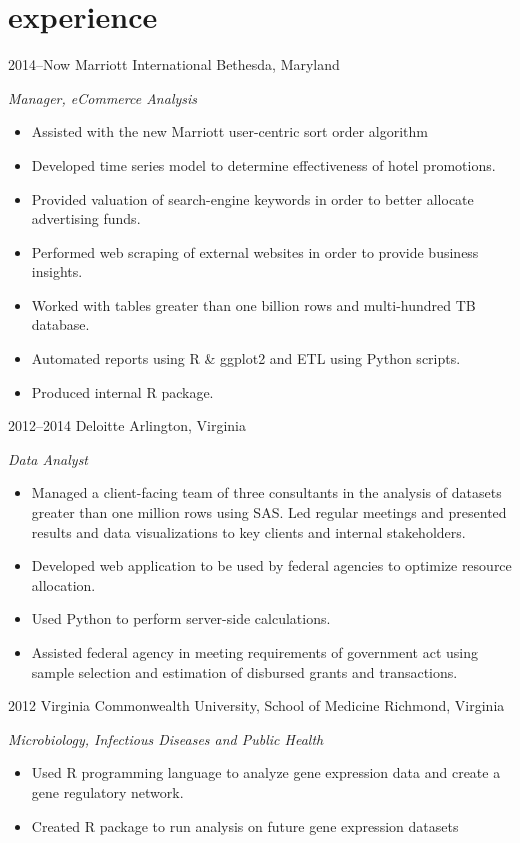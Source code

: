 \documentclass[]{friggeri-cv}
\begin{document}
\section{experience}

\begin{entrylist}
\entry
{2014--Now}
{Marriott International}
{Bethesda, Maryland}
{\emph{Manager, eCommerce Analysis}
\begin{itemize}
\renewcommand\labelitemi{--}
\item Assisted with the new Marriott user-centric sort order algorithm
\item Developed time series model to determine effectiveness of hotel promotions. 
\item Provided valuation of search-engine keywords in order to better allocate advertising funds.
\item Performed web scraping of external websites in order to provide business insights.
\item Worked with tables greater than one billion rows and multi-hundred TB database.
\item Automated reports using R \& ggplot2 and ETL using Python scripts.
\item Produced internal R package.
\end{itemize}
}
\entry
{2012--2014}
{Deloitte}
{Arlington, Virginia}
{\emph{Data Analyst}
\begin{itemize}
\renewcommand\labelitemi{--}
\item Managed a client-facing team of three consultants in the analysis of datasets greater than one million rows using SAS. 
Led regular meetings and presented results and data visualizations to key clients and internal stakeholders.
\item Developed web application to be used by federal agencies to optimize resource allocation. 
\item Used Python to perform server-side calculations.
\item Assisted federal agency in meeting requirements of government act using sample selection and estimation of disbursed grants and transactions.
\end{itemize}
}
\entry
{2012}
{Virginia Commonwealth University, School of Medicine}
{Richmond, Virginia}
{\emph{Microbiology, Infectious Diseases and Public Health}
\begin{itemize}
\renewcommand\labelitemi{--}
\item Used R programming language to analyze gene expression data and create a gene regulatory network.
\item Created R package to run analysis on future gene expression datasets
\end{itemize}
}
\end{entrylist}
\end{document}
